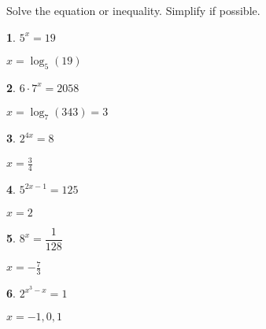 \documentclass{amsbook}
\newtheorem{exc}{}
\newenvironment{ex}{\begin{exc}\normalfont}{\end{exc}}
\numberwithin{section}{chapter}
\numberwithin{equation}{chapter}
\begin{document}
Solve the equation or inequality. Simplify if possible.
\begin{multicols}{3}
	\begin{ex}
		$5^x=19$
		\begin{sol}
		$x=\log_5 (19)$
		\end{sol}
	\end{ex}
	\begin{ex}
	$6\cdot 7^x = 2058$
	\begin{sol}
		$x=\log_7(343) = 3$
	\end{sol}
\end{ex}
	\begin{ex}
	$2^{4x}=8$
	\begin{sol}
		$x=\frac{3}{4}$
	\end{sol}
\end{ex}
	\begin{ex}
	$5^{2x-1}=125$
	\begin{sol}
		$x=2$
	\end{sol}
\end{ex}
	\begin{ex}
	$8^x=\dfrac{1}{128}$
	\begin{sol}
		$x=-\frac{7}{3}$
	\end{sol}
\end{ex}
	\begin{ex}
	$2^{x^3-x}=1$
	\begin{sol}
		$x=-1, 0, 1$
		

\end{sol}
\end{ex}
\end{multicols}
\end{document}

